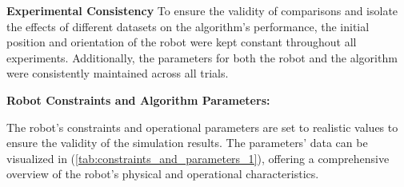 \vspace{3mm}  

\textbf{Experimental Consistency}
To ensure the validity of comparisons and isolate the effects of different datasets on the algorithm's performance, the initial position and orientation of the robot were kept constant throughout all experiments. Additionally, the parameters for both the robot and the algorithm were consistently maintained across all trials.


\vspace{3mm}  

\textbf{Robot Constraints and Algorithm Parameters: } 


The robot's constraints and operational parameters are set to realistic values to ensure the validity of the simulation results. The parameters' data can be visualized in (\autoref{tab:constraints_and_parameters_1}), offering a comprehensive overview of the robot's physical and operational characteristics.

